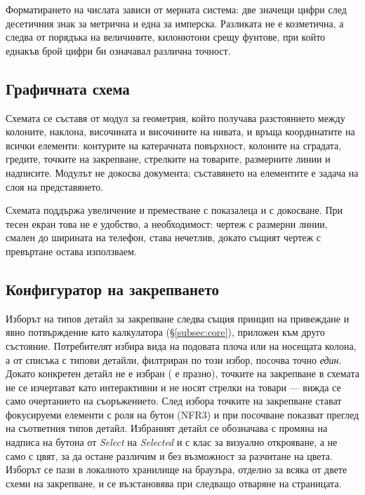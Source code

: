 Форматирането на числата зависи от мерната система: две значещи цифри след
десетичния знак за метрична и една за имперска. Разликата не е козметична, а следва
от порядъка на величините, килонютони срещу фунтове, при който еднакъв брой цифри би
означавал различна точност.

\subsection{Графичната схема}
\label{subsec:schematicimpl}

Схемата се съставя от модул за геометрия, който получава разстоянието между колоните,
наклона, височината и височините на нивата, и връща координатите на всички елементи:
контурите на катерачната повърхност, колоните на сградата, гредите, точките на
закрепване, стрелките на товарите, размерните линии и надписите. Модулът не докосва
документа; съставянето на елементите е задача на слоя на представянето.

Схемата поддържа увеличение и преместване с показалеца и с докосване. При тесен екран
това не е удобство, а необходимост: чертеж с размерни линии, смален до ширината на
телефон, става нечетлив, докато същият чертеж с превъртане остава използваем.

\subsection{Конфигуратор на закрепването}
\label{subsec:attachimpl}

Изборът на типов детайл за закрепване следва същия принцип на привеждане и явно
потвърждение като калкулатора (§\ref{subsec:core}), приложен към друго състояние.
Потребителят избира вида на подовата плоча или на носещата колона, а от списъка с
типови детайли, филтриран по този избор, посочва точно \emph{един}. Докато конкретен
детайл не е избран ( е празно), точките на закрепване в схемата не
се изчертават като интерактивни и не носят стрелки на товари — вижда се само
очертанието на съоръжението. След избора точките на закрепване стават фокусируеми
елементи с роля на бутон (NFR3) и при посочване показват преглед на съответния типов
детайл. Избраният детайл се обозначава с промяна на надписа на бутона от
\emph{Select} на \emph{Selected} и с клас за визуално открояване, а не само с цвят,
за да остане различим и без възможност за разчитане на цвета. Изборът се пази в
локалното хранилище на браузъра, отделно за всяка от двете схеми на закрепване, и се
възстановява при следващо отваряне на страницата.

